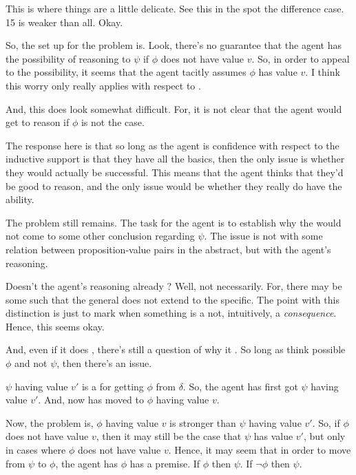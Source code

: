 \begin{note}
  This is where things are a little delicate.
  See this in the spot the difference case.
  15 is weaker than all.
  Okay.

  So, the set up for the problem is.
  Look, there's no guarantee that the agent has the possibility of reasoning to \(\psi\) if \(\phi\) does not have value \(v\).
  So, in order to appeal to the possibility, it seems that the agent tacitly assumes \(\phi\) has value \(v\).
  I think this worry only really applies with respect to \LCS{}.

  And, this does look somewhat difficult.
  For, it is not clear that the agent would get to reason if \(\phi\) is not the case.

  The response here is that so long as the agent is confidence with respect to the inductive support is that they have all the basics, then the only issue is whether they would actually be successful.
  This means that the agent thinks that they'd be good to reason, and the only issue would be whether they really do have the ability.

  The problem still remains.
  The task for the agent is to establish why the would not come to some other conclusion regarding \(\psi\).
  The issue is not with some relation between proposition-value pairs in the abstract, but with the agent's reasoning.

  Doesn't the agent's reasoning already \indicateN{}?
  Well, not necessarily.
  For, there may be some \epPW{} such that the general does not extend to the specific.
  The point with this distinction is just to mark when something is a not, intuitively, a \emph{consequence}.
  Hence, this seems okay.

  And, even if it does \indicateV{}, there's still a question of why it \indicateV{}.
  So long as think possible \(\phi\) and not \(\psi\), then there's an issue.

  \(\psi\) having value \(v'\) is a \requ{} for getting \(\phi\) from \(\delta\).
  So, the agent has first got \(\psi\) having value \(v'\).
  And, now has moved to \(\phi\) having value \(v\).

  Now, the problem is,
  \(\phi\) having value \(v\) is stronger than \(\psi\) having value \(v'\).
  So, if \(\phi\) does not have value \(v\), then it may still be the case that \(\psi\) has value \(v'\), but only in cases where \(\phi\) does not have value \(v\).
  Hence, it may seem that in order to move from \(\psi\) to \(\phi\), the agent has \(\phi\) has a premise.
  If \(\phi\) then \(\psi\).
  If \(\lnot\phi\) then \(\psi\).


\end{note}
